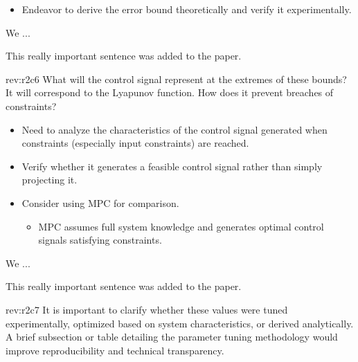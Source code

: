 \documentclass[12pt,english]{reviewresponse}
\begin{document}
\begin{howtoanswer}
    \begin{itemize}
        \item Endeavor to derive the error bound theoretically and verify it experimentally.
    \end{itemize}
\end{howtoanswer}

\begin{revresponse}
    We ...
    \begin{changes}
        This really important sentence was added to the paper.
    \end{changes}
\end{revresponse}

\begin{revcomment}[1]{rev:r2c6}
    What will the control signal represent at the extremes of these bounds? It will correspond to the Lyapunov function. How does it prevent breaches of constraints?
\end{revcomment}

\begin{howtoanswer}
    \begin{itemize}
        \item Need to analyze the characteristics of the control signal generated when constraints (especially input constraints) are reached.
        \item Verify whether it generates a feasible control signal rather than simply projecting it.
        \item Consider using MPC for comparison.
        \begin{itemize}
            \item MPC assumes full system knowledge and generates optimal control signals satisfying constraints.
        \end{itemize}
    \end{itemize}
\end{howtoanswer}

\begin{revresponse}
    We ...
    \begin{changes}
        This really important sentence was added to the paper.
    \end{changes}
\end{revresponse}

\begin{revcomment}[2]{rev:r2c7}
    It is important to clarify whether these values were tuned experimentally, optimized based on system characteristics, or derived analytically. A brief subsection or table detailing the parameter tuning methodology would improve reproducibility and technical transparency.
\end{revcomment}
\end{document}
